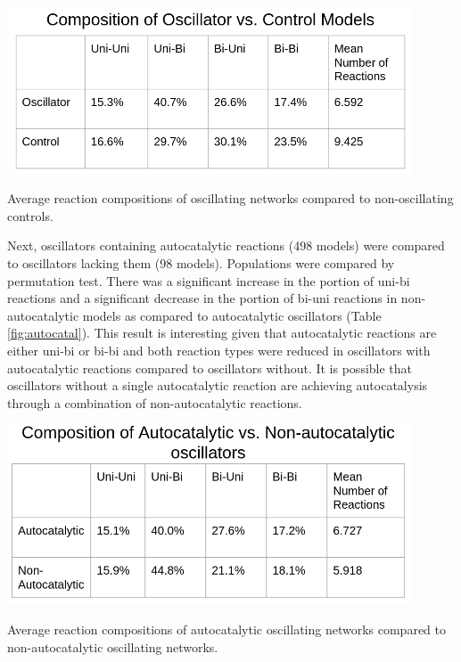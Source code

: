 \documentclass[12pt]{report}
\begin{document}
\begin{table}
	\centering
    \includegraphics[width=12cm]{images/composition.png}
    \caption[Composition of oscillator vs. control models]{Average reaction compositions of oscillating networks compared to non-oscillating controls.}
    \label{fig:avg-comp}
\end{table}

Next, oscillators containing autocatalytic reactions (498 models) were compared to oscillators lacking them (98 models). Populations were compared by permutation test. There was a significant increase in the portion of uni-bi reactions and a significant decrease in the portion of bi-uni reactions in non-autocatalytic models as compared to autocatalytic oscillators (Table \ref{fig:autocatal}). This result is interesting given that autocatalytic reactions are either uni-bi or bi-bi and both reaction types were reduced in oscillators with autocatalytic reactions compared to oscillators without. It is possible that oscillators without a single autocatalytic reaction are achieving autocatalysis through a combination of non-autocatalytic reactions.

\begin{table}
	\centering
    \includegraphics[width=12cm]{images/autocomp.png}
    \caption[Composition of autocatalyitic vs. non autocatalytic oscillators]{Average reaction compositions of autocatalytic oscillating networks compared to non-autocatalytic oscillating networks.}
    \label{fig:autocatal}
\end{table}
\end{document}
